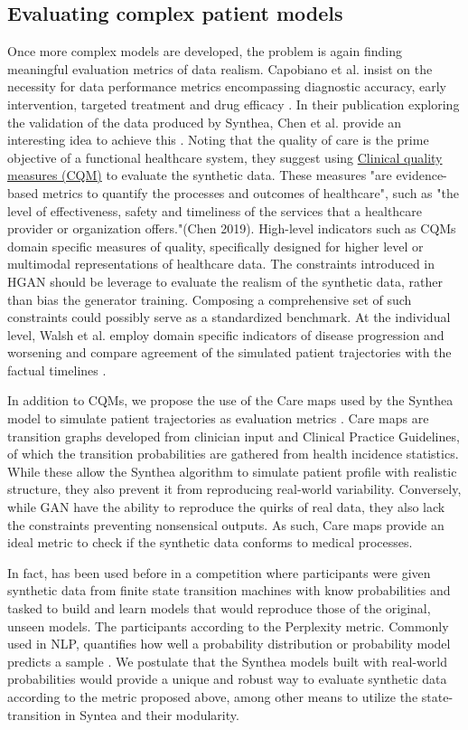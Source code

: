 \subsection{Evaluating complex patient models}
Once more complex models are developed, the problem is again finding meaningful evaluation metrics of data realism. Capobiano et al. insist on the necessity for data performance metrics encompassing diagnostic accuracy, early intervention, targeted treatment and drug efficacy \cite{Capobianco2020}. In their publication exploring the validation of the data produced by Synthea, Chen et al. provide an interesting idea to achieve this \cite{Chen_2019}. Noting that the quality of care is the prime objective of a functional healthcare system, they suggest using \hyperlink{CQM}{Clinical quality measures (CQM)} to evaluate the synthetic data. These measures "are evidence-based metrics to quantify the processes and outcomes of healthcare", such as "the level of effectiveness, safety and timeliness of the services that a healthcare provider or organization offers."(Chen 2019). High-level indicators such as \hypertarget{CQM}{CQMs} domain specific measures of quality, specifically designed for higher level or multimodal representations of healthcare data. The constraints introduced in HGAN should be leverage to evaluate the realism of the synthetic data, rather than bias the generator training. Composing a comprehensive set of such constraints could possibly serve as a standardized benchmark.
At the individual level, Walsh et al. employ domain specific indicators of disease progression and worsening and compare agreement of the simulated patient trajectories with the factual timelines \cite{walsh2020generating}.\par
In addition to \hypertarget{CQM}{CQMs}, we propose the use of the Care maps used by the Synthea model to simulate patient trajectories as evaluation metrics \cite{Walonoski_2017}. Care maps are transition graphs developed from clinician input and Clinical Practice Guidelines, of which the transition probabilities are gathered from health incidence statistics. While these allow the Synthea algorithm to simulate patient profile with realistic structure, they also prevent it from reproducing real-world variability. Conversely, while GAN have the ability to reproduce the quirks of real data, they also lack the constraints preventing nonsensical outputs. As such, Care maps provide an ideal metric to check if the synthetic data conforms to medical processes.\par 
In fact, has been used before in a competition where participants were given synthetic data from finite state transition machines with know probabilities and tasked to build and learn models that would reproduce those of the original, unseen models. The participants according to the Perplexity metric. Commonly used in NLP, quantifies how well a probability distribution or probability model predicts a sample \cite{Verwer_2013}. We postulate that the Synthea models built with real-world probabilities would provide a unique and robust way to evaluate synthetic data according to the metric proposed above, among other means to utilize the state-transition in Syntea and their modularity.

